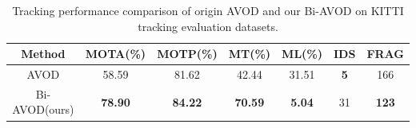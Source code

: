 \documentclass[letterpaper, 10 pt, conference]{ieeeconf}  %
\begin{document}
\begin{table}\centering
	\begin{tabular}{ccccccc}
		\toprule[1.5pt]
		Method        & MOTA(\%) & MOTP(\%) & MT(\%) & ML(\%) & IDS & FRAG \\ \midrule
		AVOD\cite{ku2018joint}          & 58.59    & 81.62    & 42.44  & 31.51  & \textbf{5}   & 166  \\
		Bi-AVOD(ours) & \textbf{78.90}    & \textbf{84.22}    & \textbf{70.59}  & \textbf{5.04}  & 31  &  \textbf{123}  \\ 
		\bottomrule[1.5pt]
	\end{tabular}
	\caption{Tracking performance comparison of origin AVOD and our Bi-AVOD on KITTI tracking evaluation datasets.}
	\label{label:result_tracking}
\end{table}
\end{document}
